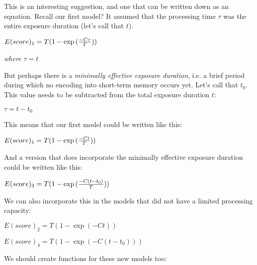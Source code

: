 \documentclass[11pt]{article}
\begin{document}
This is an interesting suggestion, and one that can be written down as
an equation. Recall our first model? It assumed that the processing time
\(\tau\) was the entire exposure duration (let's call that \(t\)).

\(E(score)_{1} = T (1 - \exp{({{-C \tau} \over {T}})})\)

\emph{where \(\tau = t\)}

But perhaps there is a \emph{minimally effective exposure duration},
i.e. a brief period during which no encoding into short-term memory
occurs yet. Let's call that \(t_{0}\). This value needs to be subtracted
from the total exposure duration \(t\):

\(\tau = t - t_{0}\)

This means that our first model could be written like this:

\(E(score)_{1} = T (1 - \exp{({{-C t} \over {T}})})\)

And a version that does incorporate the minimally effective exposure
duration could be written like this:

\(E(score)_{3} = T (1 - \exp{({{-C (t - t_{0})} \over {T}})})\)

We can also incorporate this in the models that did not have a limited
processing capacity:

\(E(score)_{2} = T (1 - \exp{(-C t)})\)

\(E(score)_{4} = T (1 - \exp{(-C (t - t_{0}))})\)

We should create functions for these new models too:
\end{document}
